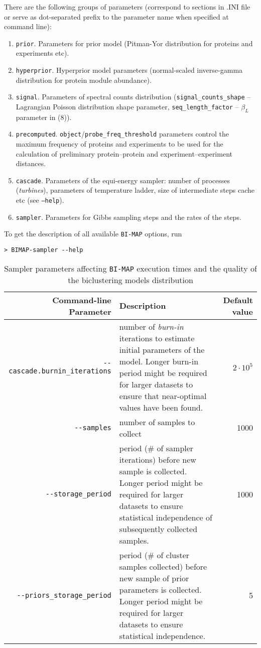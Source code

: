 \documentclass[microtype,a4paper,article,10pt,oneside,final]{memoir}
\newcommand{\bimap}{\texttt{BI-MAP}\xspace}
\begin{document}
There are the following groups of parameters
(correspond to sections in .INI file or serve as dot-separated prefix
to the parameter name when specified at command line):
\begin{enumerate}
  \item \texttt{prior}. Parameters for prior model (Pitman-Yor distribution for proteins and experiments etc).
  \item \texttt{hyperprior}. Hyperprior model parameters (normal-scaled inverse-gamma distribution for protein module abundance).
  \item \texttt{signal}. Parameters of spectral counts distribution (\texttt{signal\_counts\_shape} -- Lagrangian Poisson distribution shape parameter,
\texttt{seq\_length\_factor} -- $\beta_L$ parameter in (8)).
  \item \texttt{precomputed}. \texttt{object}/\texttt{probe\_freq\_threshold} parameters control
the maximum frequency of proteins and experiments to be used for the calculation of
preliminary protein--protein and experiment--experiment distances.
  \item \texttt{cascade}. Parameters of the equi-energy sampler: number of processes (\emph{turbines}),
parameters of temperature ladder, size of intermediate steps cache etc (see \texttt{--help}).
  \item \texttt{sampler}. Parameters for Gibbs sampling steps and the rates of the steps.
\end{enumerate}

To get the description of all available \bimap options, run
\begin{verbatim}
> BIMAP-sampler --help
\end{verbatim}

\begin{table}[h]
\caption{Sampler parameters affecting \bimap execution times and the quality of the biclustering models distribution}

\begin{tabular}{rp{}r}
Command-line Parameter & Description & Default value \\
\hline

\verb|--cascade.burnin_iterations|
& number of \emph{burn-in} iterations to estimate initial parameters of the model.
Longer burn-in period might be required for larger datasets to ensure that near-optimal values have been found.
& $2 \cdot 10^5$ \\
\verb|--samples| & number of samples to collect & 1000 \\
\verb|--storage_period| & period (\# of sampler iterations) before new sample is collected.
Longer period might be required for larger datasets to ensure statistical independence of
subsequently collected samples.
& 1000 \\
\verb|--priors_storage_period| & period (\# of cluster samples collected)
before new sample of prior parameters is collected.
Longer period might be required for larger datasets to ensure statistical independence.
& 5
\end{tabular}
\end{table}
\end{document}
